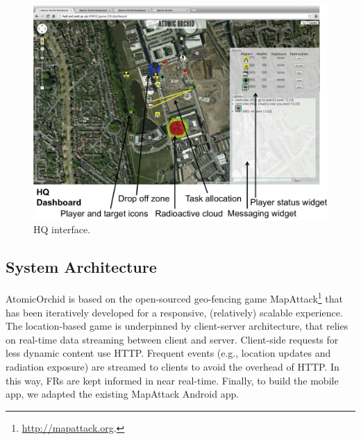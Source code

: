 \begin{figure}[htbp]
\includegraphics[width=\columnwidth]{dashboard.png}
\caption{HQ interface.}
\label{fig:ui2}
\end{figure}

\subsection{System Architecture}
\noindent AtomicOrchid is based on the open-sourced geo-fencing game MapAttack\footnote{\url{http://mapattack.org}.} that has been iteratively developed for a responsive, (relatively) scalable experience.  The location-based game is underpinned by client-server architecture, that relies on real-time data streaming between client and server. Client-side requests for less dynamic content use HTTP. Frequent events (e.g., location updates and radiation exposure) are streamed to clients to avoid the overhead of HTTP. In this way, FRs are kept informed in near real-time. Finally,  to build the mobile app, we adapted the existing MapAttack Android app.


